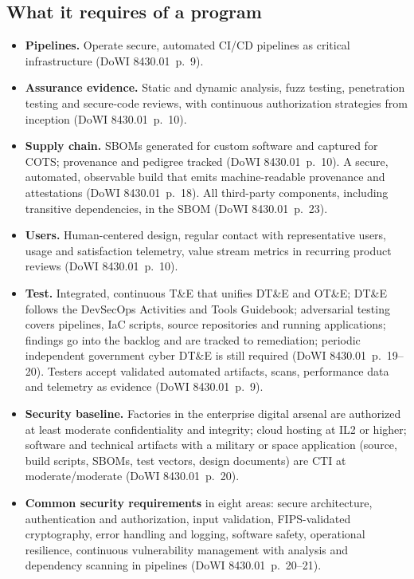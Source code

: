 \documentclass[11pt,letterpaper,twoside,openany]{memoir}
\newcommand{\pg}[2]{{\small(#1~p.~#2)}}          %
\begin{document}
\subsection{What it requires of a program}
\begin{itemize}
\item \textbf{Pipelines.} Operate secure, automated CI/CD pipelines as critical infrastructure \pg{DoWI 8430.01}{9}.
\item \textbf{Assurance evidence.} Static and dynamic analysis, fuzz testing, penetration testing and secure-code
  reviews, with continuous authorization strategies from inception \pg{DoWI 8430.01}{10}.
\item \textbf{Supply chain.} SBOMs generated for custom software and captured for COTS; provenance and pedigree tracked
  \pg{DoWI 8430.01}{10}. A secure, automated, observable build that emits machine-readable provenance and attestations
  \pg{DoWI 8430.01}{18}. All third-party components, including transitive dependencies, in the SBOM
  \pg{DoWI 8430.01}{23}.
\item \textbf{Users.} Human-centered design, regular contact with representative users, usage and satisfaction
  telemetry, value stream metrics in recurring product reviews \pg{DoWI 8430.01}{10}.
\item \textbf{Test.} Integrated, continuous T\&E that unifies DT\&E and OT\&E; DT\&E follows the DevSecOps Activities
  and Tools Guidebook; adversarial testing covers pipelines, IaC scripts, source repositories and running
  applications; findings go into the backlog and are tracked to remediation; periodic independent government cyber
  DT\&E is still required \pg{DoWI 8430.01}{19--20}. Testers accept validated automated artifacts, scans, performance
  data and telemetry as evidence \pg{DoWI 8430.01}{9}.
\item \textbf{Security baseline.} Factories in the enterprise digital arsenal are authorized at least moderate
  confidentiality and integrity; cloud hosting at IL2 or higher; software and technical artifacts with a military or
  space application (source, build scripts, SBOMs, test vectors, design documents) are CTI at moderate/moderate
  \pg{DoWI 8430.01}{20}.
\item \textbf{Common security requirements} in eight areas: secure architecture, authentication and authorization,
  input validation, FIPS-validated cryptography, error handling and logging, software safety, operational resilience,
  continuous vulnerability management with analysis and dependency scanning in pipelines \pg{DoWI 8430.01}{20--21}.

\end{itemize}
\end{document}
